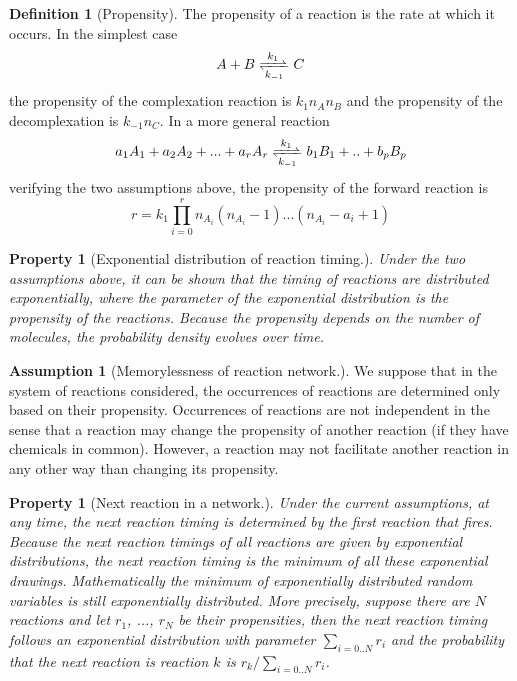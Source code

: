 \documentclass[12pt]{scrartcl}
\newtheorem{property}[thm]{Property}
\theoremstyle{definition}
\newtheorem{defn}[thm]{Definition}
\newtheorem{assum}[thm]{Assumption}
\theoremstyle{remark}
\numberwithin{equation}{section}
\newcommand{\reactionRev}[4]{#1 \ce{<=>[#3][#4]} #2}
\begin{document}
\begin {defn}[Propensity] 
  The propensity of a reaction is the rate at which it occurs. In the simplest case
\[
\reactionRev{A + B}{C}{k_1}{k_{-1}}
\]
the propensity of the complexation reaction is $k_1 n_A n_B$ and the propensity of the decomplexation is $k_{-1}n_C$. In a more general reaction
\[
\reactionRev{a_1A_1 + a_2A_2 + ... + a_rA_r}{b_1B_1+..+b_pB_p}{k_1}{k_{-1}}
\]
verifying the two assumptions above, the propensity of the forward reaction is
\[
r = k_1 \prod\limits_{i=0}^{r}n_{A_i}(n_{A_i}-1)...(n_{A_i}-a_i+1)
\]
\end {defn}

\begin {property}[Exponential distribution of reaction timing.] 
  Under the two assumptions above, it can be shown that the timing of reactions are distributed exponentially, where the parameter of the exponential distribution is the propensity of the reactions. Because the propensity depends on the number of molecules, the probability density evolves over time.
\end {property}

\begin {assum}[Memorylessness of reaction network.] 
  We suppose that in the system of reactions considered, the occurrences of reactions are determined only based on their propensity. Occurrences of reactions are not independent in the sense that a reaction may change the propensity of another reaction (if they have chemicals in common). However, a reaction may not facilitate another reaction in any other way than changing its propensity.
\end {assum}

\begin {property}[Next reaction in a network.] 
  Under the current assumptions, at any time, the next reaction timing is determined by the first reaction that fires. Because the next reaction timings of all reactions are given by exponential distributions, the next reaction timing is the minimum of all these exponential drawings. Mathematically the minimum of exponentially distributed random variables is still exponentially distributed. More precisely, suppose there are $N$ reactions and let $r_1$, ..., $r_N$ be their propensities, then the next reaction timing follows an exponential distribution with parameter $\sum_{i=0..N}r_i$ and the probability that the next reaction is reaction $k$ is $r_k/\sum_{i=0..N}r_i$.
\end {property}
\end{document}
